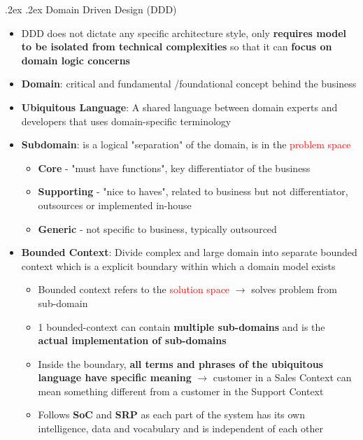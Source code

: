 \documentclass[10pt,landscape,a4paper]{article}
\makeatletter
\renewcommand{\subsubsection}{\@startsection{subsubsection}{1}{0mm}%
	{.2ex}%
	{.2ex}%
	{\rmfamily\bfseries}}
\makeatother
\begin{document}
\begin{multicols*}{4}
		\subsubsection{Domain Driven Design (DDD)}
		\begin{itemize}
			\item DDD does not dictate any specific architecture style, only \textbf{requires model to be isolated from technical complexities} so that it can\textbf{ focus on domain logic concerns}
			\item \textbf{Domain}: critical and fundamental /foundational concept behind the business
			\item \textbf{Ubiquitous Language}: A shared language between domain experts and developers that uses domain-specific terminology
			\item \textbf{Subdomain}: is a logical "separation" of the domain, is in the \textcolor{red}{problem space}
			\begin{itemize}
				\item \textbf{Core} - "must have functions", key differentiator of the business
				\item \textbf{Supporting} - "nice to haves", related to business but not differentiator, outsources or implemented in-house
				\item \textbf{Generic} - not specific to business, typically outsourced
			\end{itemize}
			\item \textbf{Bounded Context}: Divide complex and large domain into separate bounded context which is a explicit boundary within which a domain model exists
			\begin{itemize}
				\item Bounded context refers to the \textcolor{red}{solution space} $\rightarrow$ solves problem from sub-domain
				\item 1 bounded-context can contain \textbf{multiple sub-domains} and is the \textbf{actual implementation of sub-domains}
				\item Inside the boundary, \textbf{all terms and phrases of the ubiquitous language have specific meaning} $\rightarrow$ customer in a Sales Context can mean something different from a customer in the Support Context
				\item Follows \textbf{SoC} and \textbf{SRP} as each part of the system has its own intelligence, data and vocabulary and is independent of each other
			\end{itemize}
		\end{itemize}

\end{multicols*}
\end{document}
